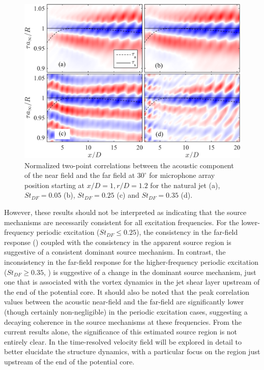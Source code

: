 \begin{figure}
	\centering
	\includegraphics[width=\linewidth]{Figures/sect_nearfield_ffxcorr.png}
	\caption{Normalized two-point correlations between the acoustic component of the near field and the far field at $30^\circ$ for microphone array position starting at $x/D = 1, r/D = 1.2$ for the natural jet (a), $St_{DF} = 0.05$ (b), $St_{DF} = 0.25$ (c) and $St_{DF} = 0.35$ (d).}
	\label{fig:ch3_xcorrOA}
\end{figure}

However, these results should not be interpreted as indicating that the source mechanisms are necessarily consistent for all excitation frequencies. 
For the lower-frequency periodic excitation ($St_{DF} \leq 0.25$), the consistency in the far-field response () coupled with the consistency in the apparent source region is suggestive of a consistent dominant source mechanism.
In contrast, the inconsistency in the far-field response for the higher-frequency periodic excitation ($St_{DF} \geq 0.35$, ) is suggestive of a change in the dominant source mechanism, just one that is associated with the vortex dynamics in the jet shear layer upstream of the end of the potential core.
It should also be noted that the peak correlation values between the acoustic near-field and the far-field are significantly lower (though certainly non-negligible) in the periodic excitation cases, suggesting a decaying coherence in the source mechanisms at these frequencies.
From the current results alone, the significance of this estimated source region is not entirely clear.
In  the time-resolved velocity field will be explored in detail to better elucidate the structure dynamics, with a particular focus on the region just upstream of the end of the potential core.

